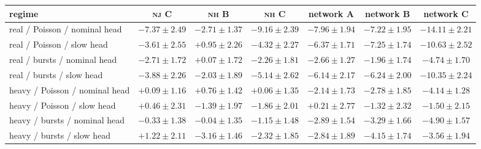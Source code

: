 \begin{tabular}{@{}lcccccc@{}}
\toprule
regime & \textsc{nj} C & \textsc{nh} B & \textsc{nh} C & network A & network B & network C \\
\midrule
real / Poisson / nominal head & $-7.37 \pm 2.49$ & $-2.71 \pm 1.37$ & $-9.16 \pm 2.39$ & $-7.96 \pm 1.94$ & $-7.22 \pm 1.95$ & $-14.11 \pm 2.21$ \\
real / Poisson / slow head & $-3.61 \pm 2.55$ & $+0.95 \pm 2.26$ & $-4.32 \pm 2.27$ & $-6.37 \pm 1.71$ & $-7.25 \pm 1.74$ & $-10.63 \pm 2.52$ \\
real / bursts / nominal head & $-2.71 \pm 1.72$ & $+0.07 \pm 1.72$ & $-2.26 \pm 1.81$ & $-2.66 \pm 1.27$ & $-1.96 \pm 1.74$ & $-4.74 \pm 1.70$ \\
real / bursts / slow head & $-3.88 \pm 2.26$ & $-2.03 \pm 1.89$ & $-5.14 \pm 2.62$ & $-6.14 \pm 2.17$ & $-6.24 \pm 2.00$ & $-10.35 \pm 2.24$ \\
heavy / Poisson / nominal head & $+0.09 \pm 1.16$ & $+0.76 \pm 1.42$ & $+0.06 \pm 1.35$ & $-2.14 \pm 1.73$ & $-2.78 \pm 1.85$ & $-4.14 \pm 1.28$ \\
heavy / Poisson / slow head & $+0.46 \pm 2.31$ & $-1.39 \pm 1.97$ & $-1.86 \pm 2.01$ & $+0.21 \pm 2.77$ & $-1.32 \pm 2.32$ & $-1.50 \pm 2.15$ \\
heavy / bursts / nominal head & $-0.33 \pm 1.38$ & $-0.04 \pm 1.35$ & $-1.15 \pm 1.48$ & $-2.89 \pm 1.54$ & $-3.29 \pm 1.66$ & $-4.90 \pm 1.57$ \\
heavy / bursts / slow head & $+1.22 \pm 2.11$ & $-3.16 \pm 1.46$ & $-2.32 \pm 1.85$ & $-2.84 \pm 1.89$ & $-4.15 \pm 1.74$ & $-3.56 \pm 1.94$ \\
\bottomrule
\end{tabular}
